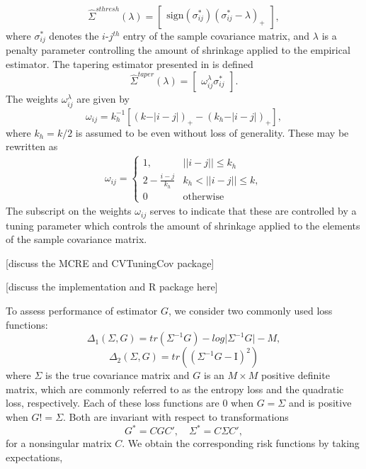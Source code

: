 \documentclass[12pt]{article}
\theoremstyle{definition}
\begin{document}
\[
\hat{\Sigma}^{sthresh}\left(\lambda\right) =   \begin{bmatrix} \mbox{sign}\left(\sigma^*_{ij}\right) \left(\sigma^*_{ij} - \lambda\right)_+ \end{bmatrix},
\]
\noindent 
where $\sigma^*_{ij}$ denotes the $i$-$j^{th}$ entry of the sample covariance matrix, and $\lambda$ is a penalty parameter controlling the amount of shrinkage applied to the empirical estimator. The tapering estimator presented in \citet{cai2010optimal} is defined
\[
\hat{\Sigma}^{taper}\left(\lambda\right) =  \begin{bmatrix} \omega_{ij}^\lambda \sigma^*_{ij} \end{bmatrix}.
\]
\noindent
The weights $\omega_{ij}^\lambda$ are given by 
\begin{equation*}
\omega_{ij} = k_h^{-1} \left[ \left( k - \vert i-j\vert\right)_+ - \left(k_h - \vert i-j\vert\right)_+ \right],
\end{equation*}
\noindent
where $k_h = k/2$ is assumed to be even without loss of generality. These may be rewritten as
\begin{align*}
\omega_{ij} = \left\{\begin{array}{ll} 1, & \vert \vert i -j \vert \vert \le k_h \\
                             2 - \frac{i - j}{k_h} & k_h < \vert \vert i -j \vert \vert \le k, \\
                             0 & \mbox{otherwise}  \end{array} \right.
\end{align*}
\noindent
The subscript on the weights $\omega_{ij}$ serves to indicate that these are controlled by a tuning parameter which controls the amount of shrinkage applied to the elements of the sample covariance matrix.

[discuss the MCRE and CVTuningCov package]

\bigskip

[discuss the implementation and R package here]

To assess performance of estimator $G$, we consider two commonly used loss functions:
\begin{equation}
\Delta_1\left(\Sigma,G \right) = tr\left( \Sigma^{-1} G \right) - log \vert \Sigma^{-1} G \vert - M,
\end{equation}
\noindent
\begin{equation}
\Delta_2\left(\Sigma,G\right) = tr\left(\left( \Sigma^{-1} G - \mathrm{I}\right)^2 \right)
\end{equation}
\noindent
where $\Sigma$ is the true covariance matrix and $G$ is an $M \times M$ positive definite matrix, which are commonly referred to as the entropy loss and the quadratic loss, respectively. Each of these loss functions are $0$ when $G = \Sigma$ and is positive when $G != \Sigma$. Both are invariant with respect to transformations
\[
G^* = C G C', \quad \Sigma^* = C \Sigma C',
\]
\noindent
for a nonsingular matrix $C$. We obtain the corresponding risk functions by taking expectations,
\end{document}
